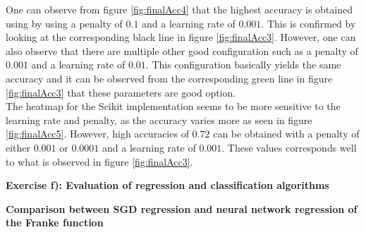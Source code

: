 \documentclass[12pt,a4paper]{article}
\begin{document}
\noindent One can observe from figure \ref{fig:finalAcc4} that the highest accuracy is obtained using by using a penalty of $0.1$ and a learning rate of $0.001$. This is confirmed by looking at the corresponding black line in figure \ref{fig:finalAcc3}. However, one can also observe that there are multiple other good configuration such as a penalty of $0.001$ and a learning rate of $0.01$. This configuration basically yields the same accuracy and it can be observed from the corresponding green line in figure \ref{fig:finalAcc3} that these parameters are good option.
\\
The heatmap for the Scikit implementation seems to be more sensitive to the learning rate and penalty, as the accuracy varies more as seen in figure \ref{fig:finalAcc5}. However, high accuracies of $0.72$ can be obtained with a penalty of either $0.001$ or $0.0001$ and a learning rate of $0.001$. These values corresponds well to what is observed in figure \ref{fig:finalAcc3}.

\newpage

\begin{center}
\Large{\textbf{Exercise f): Evaluation of regression and classification algorithms}}
\end{center}

\begin{center}
\large{\textbf{Comparison between SGD regression and neural network regression of the Franke function}}
\end{center}
\end{document}
